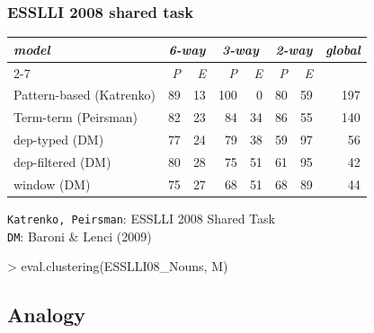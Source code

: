 \documentclass[t]{beamer} %
\begin{document}
\begin{frame}[fragile]
  \frametitle{ESSLLI 2008 shared task}

  \begin{center}\small
    \begin{tabular}{|l|r|r||r|r||r|r||r|}
      \hline
      \emph{model} &\multicolumn{2}{|c||}{\emph{6-way}} &  \multicolumn{2}{|c||}{\emph{3-way}} & \multicolumn{2}{|c||}{\emph{2-way}}&  \multicolumn{1}{|c|}{\emph{global}}\\
      \cline{2-7}
                   &   \emph{P} & \emph{E}  & \emph{P} & \emph{E}  & \emph{P} & \emph{E} &\\
      \hline
      \hline
      Pattern-based (Katrenko) & 89 & 13 & 100 & 0 & 80 & 59 & 197\\ 
      \hline
      Term-term (Peirsman) & 82 & 23 & 84 & 34 & 86 & 55 & 140\\
      \hline
      dep-typed (DM) & 77 & 24 & 79 & 38 & 59 & 97 & 56\\
      \hline
      dep-filtered (DM) & 80 &28 & 75& 51& 61& 95 & 42\\
      \hline
      window (DM) & 75& 27&  68& 51& 68& 89   &44\\
      \hline
    \end{tabular}
  \end{center}

  \begin{center}\footnotesize
    {\tt Katrenko, Peirsman}: ESSLLI 2008 Shared Task\\
    {\tt DM}: Baroni \& Lenci (2009)
  \end{center}

  \vfill
\begin{Rcode}
> eval.clustering(ESSLLI08_Nouns, M) 
\end{Rcode}
\end{frame}


\subsection{Analogy}
\end{document}
